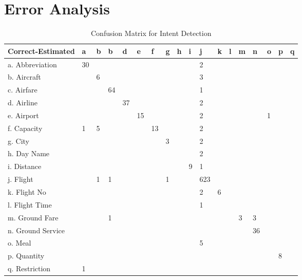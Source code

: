 \section{Error Analysis}
\begin{table}[h]
	\centering
	\begin{tabular}{ |l|l|l|l|l|l|l|l|l|l|l|l|l|l|l|l|l|l| }
		\hline
		Correct-Estimated & a & b & b & d & e & f & g & h & i & j & k & l & m & n & o & p & q \\ \hline
		a. Abbreviation & 30 &  &  &  &  &  &  &  &  & 2 &  &  &  &  &  &  &  \\ \hline
		b. Aircraft &  & 6 &  &  &  &  &  &  &  & 3 &  &  &  &  &  &  &  \\ \hline
		c. Airfare &  &  & 64 &  &  &  &  &  &  & 1 &  &  &  &  &  &  &  \\ \hline
		d. Airline &  &  &  & 37 &  &  &  &  &  & 2 &  &  &  &  &  &  &  \\ \hline
		e. Airport &  &  &  &  & 15 &  &  &  &  & 2 &  &  &  &  & 1 &  &  \\ \hline
		f. Capacity & 1 & 5 &  &  &  & 13 &  &  &  & 2 &  &  &  &  &  &  &  \\ \hline
		g. City &  &  &  &  &  &  & 3 &  &  & 2 &  &  &  &  &  &  &  \\ \hline
		h. Day Name &  &  &  &  &  &  &  &  &  & 2 &  &  &  &  &  &  &  \\ \hline
		i. Distance &  &  &  &  &  &  &  &  & 9 & 1 &  &  &  &  &  &  &  \\ \hline
		j. Flight &  & 1 & 1 &  &  &  & 1 &  &  & 623 &  &  &  &  &  &  &  \\ \hline
		k. Flight No &  &  &  &  &  &  &  &  &  & 2 & 6 &  &  &  &  &  &  \\ \hline
		l. Flight Time &  &  &  &  &  &  &  &  &  & 1 &  &  &  &  &  &  &  \\ \hline
		m. Ground Fare &  &  & 1 &  &  &  &  &  &  &  &  &  & 3 & 3 &  &  &  \\ \hline
		n. Ground Service &  &  &  &  &  &  &  &  &  &  &  &  &  & 36 &  &  &  \\ \hline
		o. Meal &  &  &  &  &  &  &  &  &  & 5 &  &  &  &  &  &  &  \\ \hline
		p. Quantity &  &  &  &  &  &  &  &  &  &  &  &  &  &  &  & 8 &  \\ \hline
		q. Restriction & 1 &  &  &  &  &  &  &  &  &  &  &  &  &  &  &  &  \\ \hline
	\end{tabular}
	\caption{Confusion Matrix for Intent Detection}
\end{table}
